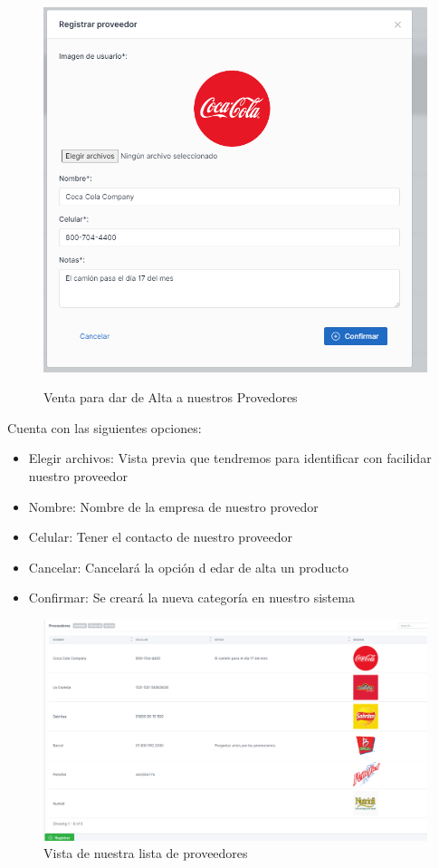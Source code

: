 \documentclass[a4paper,DIV=12]{scrreprt}
\begin{document}
	\begin{figure}[!htb]
		\centering
		\includegraphics[scale=0.5]{ALTAPROVEEDOR.PNG}\\
		\caption{Venta para dar de Alta a nuestros Provedores}
	\end{figure}
		Cuenta con las siguientes opciones:
		\begin{itemize}
	\item Elegir archivos: Vista previa que tendremos para identificar con facilidar nuestro proveedor
	\item Nombre: Nombre de la empresa de nuestro provedor
	\item Celular: Tener el contacto de nuestro proveedor
	\item Cancelar: Cancelará la opción d edar de alta un producto
	\item Confirmar: Se creará la nueva categoría en nuestro sistema
	\end{itemize}
		\begin{figure}[!htb]
		\centering
		\includegraphics[scale=0.4]{PROVEEDORES.PNG}
		\caption{Vista de nuestra lista de proveedores}
	\end{figure}
	
\end{document}
